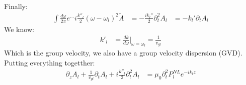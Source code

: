Finally:
\begin{align*}
	\int\frac{d\omega}{2\pi} e^{\ldots} i\frac{k''_l}{2}(\omega- \omega_l)^2\tilde{A} &= - \frac{ik_l''}{2}\partial_t^2 A_l
	&= -k_l'\partial_t A_l
\end{align*}
We know:
\begin{align*}
	k'_l &= \frac{dk}{d\omega}\Big|_{\omega=\omega_l} = \frac{1}{v_{gl}}
\end{align*}
Which is the group velocity, we also have a group velocity dispersion (GVD). Putting everything togetther:
\begin{align*}
	\partial_z A_l + \frac{1}{v_{gl}} \partial_t A_l + i\frac{k''_l}{2}\partial_t^2 A_l &= \mu_0 \partial_t^2 P_l^{NL} e^{-ik_lz}
\end{align*}

